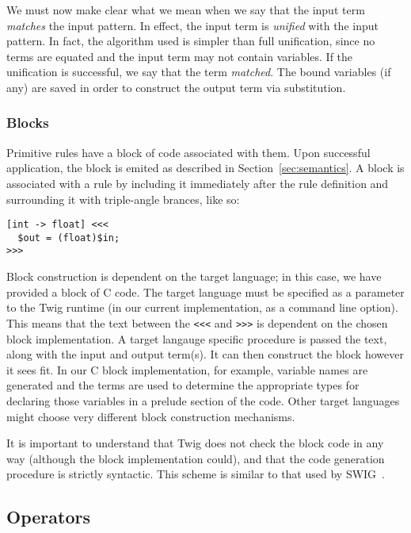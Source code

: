 We must now make clear what we mean when we say that the input term \emph{matches} the input pattern. In effect, the input term is \emph{unified}\cite{baader98rewriting} with the input pattern. In fact, the algorithm used is simpler than full unification, since no terms are equated and the input term may not contain variables. If the unification is successful, we say that the term \emph{matched}. The bound variables (if any) are saved in order to construct the output term via substitution.


\subsubsection{Blocks}

Primitive rules have a block of code associated with them. Upon successful application, the block is emited as described in Section~\ref{sec:semantics}. A block is associated with a rule by including it immediately after the rule definition and surrounding it with triple-angle brances, like so:

\begin{verbatim}
[int -> float] <<<
  $out = (float)$in;
>>>
\end{verbatim}

Block construction is dependent on the target language; in this case, we have provided a block of C code. The target language must be specified as a parameter to the Twig runtime (in our current implementation, as a command line option). This means that the text between the \texttt{<<<} and \texttt{>>>} is dependent on the chosen block implementation. A target langauge specific procedure is passed the text, along with the input and output term(s). It can then construct the block however it sees fit. In our C block implementation, for example, variable names are generated and the terms are used to determine the appropriate types for declaring those variables in a prelude section of the code. Other target languages might choose very different block construction mechanisms.

It is important to understand that Twig does not check the block code in any way (although the block implementation could), and that the code generation procedure is strictly syntactic. This scheme is similar to that used by SWIG~\cite{swig}.

\subsection{Operators}

